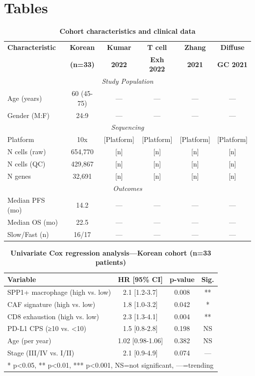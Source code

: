 \documentclass[12pt,twoside]{article}
\begin{document}
\clearpage
\section*{Tables}

\begin{table}[H]
\centering
\caption{\textbf{Cohort characteristics and clinical data}}
\label{table:1}
\begin{tabular}{l c c c c c}
\toprule
\textbf{Characteristic} & \textbf{Korean} & \textbf{Kumar} & \textbf{T cell} & \textbf{Zhang} & \textbf{Diffuse} \\
& \textbf{(n=33)} & \textbf{2022} & \textbf{Exh 2022} & \textbf{2021} & \textbf{GC 2021} \\
\midrule
\multicolumn{6}{c}{\textit{Study Population}} \\
Age (years) & 60 (45-75) & — & — & — & — \\
Gender (M:F) & 24:9 & — & — & — & — \\
\midrule
\multicolumn{6}{c}{\textit{Sequencing}} \\
Platform & 10x & [Platform] & [Platform] & [Platform] & [Platform] \\
N cells (raw) & 654,770 & [n] & [n] & [n] & [n] \\
N cells (QC) & 429,867 & [n] & [n] & [n] & [n] \\
N genes & 32,691 & [n] & [n] & [n] & [n] \\
\midrule
\multicolumn{6}{c}{\textit{Outcomes}} \\
Median PFS (mo) & 14.2 & — & — & — & — \\
Median OS (mo) & 22.5 & — & — & — & — \\
Slow/Fast (n) & 16/17 & — & — & — & — \\
\bottomrule
\end{tabular}
\end{table}

\begin{table}[H]
\centering
\caption{\textbf{Univariate Cox regression analysis—Korean cohort (n=33 patients)}}
\label{table:2}
\begin{tabular}{l c c c}
\toprule
\textbf{Variable} & \textbf{HR [95\% CI]} & \textbf{p-value} & \textbf{Sig.} \\
\midrule
SPP1+ macrophage (high vs. low) & 2.1 [1.2-3.7] & 0.008 & ** \\
CAF signature (high vs. low) & 1.8 [1.0-3.2] & 0.042 & * \\
CD8 exhaustion (high vs. low) & 2.3 [1.3-4.1] & 0.004 & ** \\
PD-L1 CPS (≥10 vs. <10) & 1.5 [0.8-2.8] & 0.198 & NS \\
Age (per year) & 1.02 [0.98-1.06] & 0.382 & NS \\
Stage (III/IV vs. I/II) & 2.1 [0.9-4.9] & 0.074 & --- \\
\bottomrule
\multicolumn{4}{l}{* p<0.05, ** p<0.01, *** p<0.001, NS=not significant, ---=trending} \\
\end{tabular}
\end{table}
\end{document}
